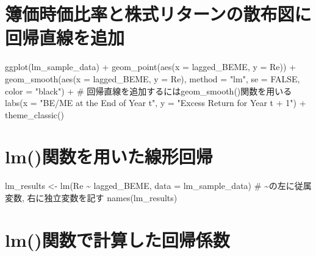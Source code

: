 \documentclass[
  letterpaper,
  DIV=11,
  numbers=noendperiod]{scrreprt}
\newenvironment{Shaded}{\begin{snugshade}}{\end{snugshade}}
\newcommand{\AttributeTok}[1]{\textcolor[rgb]{0.40,0.45,0.13}{#1}}
\newcommand{\CommentTok}[1]{\textcolor[rgb]{0.37,0.37,0.37}{#1}}
\newcommand{\ConstantTok}[1]{\textcolor[rgb]{0.56,0.35,0.01}{#1}}
\newcommand{\FunctionTok}[1]{\textcolor[rgb]{0.28,0.35,0.67}{#1}}
\newcommand{\NormalTok}[1]{\textcolor[rgb]{0.00,0.23,0.31}{#1}}
\newcommand{\OtherTok}[1]{\textcolor[rgb]{0.00,0.23,0.31}{#1}}
\newcommand{\SpecialCharTok}[1]{\textcolor[rgb]{0.37,0.37,0.37}{#1}}
\newcommand{\StringTok}[1]{\textcolor[rgb]{0.13,0.47,0.30}{#1}}
\begin{document}
\section{簿価時価比率と株式リターンの散布図に回帰直線を追加}\label{ux7c3fux4fa1ux6642ux4fa1ux6bd4ux7387ux3068ux682aux5f0fux30eaux30bfux30fcux30f3ux306eux6563ux5e03ux56f3ux306bux56deux5e30ux76f4ux7ddaux3092ux8ffdux52a0}

\begin{Shaded}
\begin{Highlighting}[]
\FunctionTok{ggplot}\NormalTok{(lm\_sample\_data) }\SpecialCharTok{+} 
  \FunctionTok{geom\_point}\NormalTok{(}\FunctionTok{aes}\NormalTok{(}\AttributeTok{x =}\NormalTok{ lagged\_BEME, }\AttributeTok{y =}\NormalTok{ Re)) }\SpecialCharTok{+} 
  \FunctionTok{geom\_smooth}\NormalTok{(}\FunctionTok{aes}\NormalTok{(}\AttributeTok{x =}\NormalTok{ lagged\_BEME, }\AttributeTok{y =}\NormalTok{ Re), }\AttributeTok{method =} \StringTok{"lm"}\NormalTok{, }\AttributeTok{se =} \ConstantTok{FALSE}\NormalTok{, }\AttributeTok{color =} \StringTok{"black"}\NormalTok{) }\SpecialCharTok{+} \CommentTok{\# 回帰直線を追加するにはgeom\_smooth()関数を用いる}
  \FunctionTok{labs}\NormalTok{(}\AttributeTok{x =} \StringTok{"BE/ME at the End of Year t"}\NormalTok{, }\AttributeTok{y =} \StringTok{"Excess Return for Year t + 1"}\NormalTok{) }\SpecialCharTok{+} 
  \FunctionTok{theme\_classic}\NormalTok{()}
\end{Highlighting}
\end{Shaded}

\section{lm()関数を用いた線形回帰}\label{lmux95a2ux6570ux3092ux7528ux3044ux305fux7ddaux5f62ux56deux5e30}

\begin{Shaded}
\begin{Highlighting}[]
\NormalTok{lm\_results }\OtherTok{\textless{}{-}} \FunctionTok{lm}\NormalTok{(Re }\SpecialCharTok{\textasciitilde{}}\NormalTok{ lagged\_BEME, }\AttributeTok{data =}\NormalTok{ lm\_sample\_data) }\CommentTok{\# \textasciitilde{}の左に従属変数, 右に独立変数を記す}
\FunctionTok{names}\NormalTok{(lm\_results)}
\end{Highlighting}
\end{Shaded}

\section{lm()関数で計算した回帰係数}\label{lmux95a2ux6570ux3067ux8a08ux7b97ux3057ux305fux56deux5e30ux4fc2ux6570}
\end{document}
